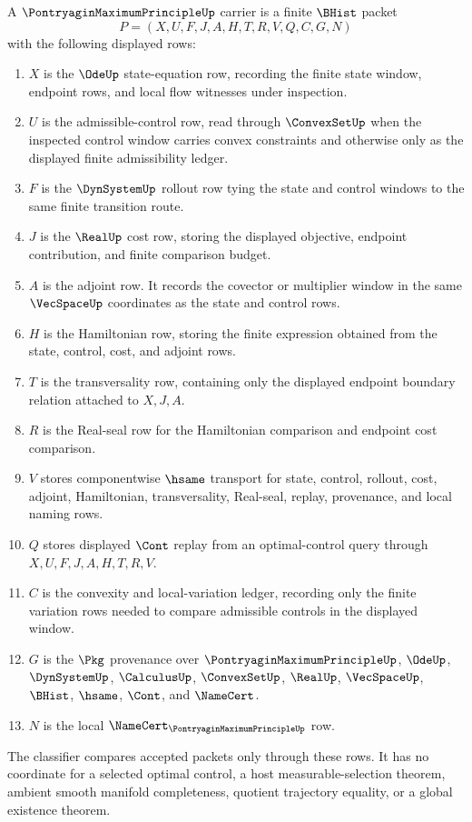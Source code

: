 \begin{definition}
\label{def:pontryagin-maximum-principle-carrier}
A $\PontryaginMaximumPrincipleUp$ carrier is a finite $\BHist$ packet
$$
P=(X,U,F,J,A,H,T,R,V,Q,C,G,N)
$$
with the following displayed rows:
\begin{enumerate}
\item $X$ is the $\OdeUp$ state-equation row, recording the finite state window, endpoint rows, and local flow witnesses under inspection.
\item $U$ is the admissible-control row, read through $\ConvexSetUp$ when the inspected control window carries convex constraints and otherwise only as the displayed finite admissibility ledger.
\item $F$ is the $\DynSystemUp$ rollout row tying the state and control windows to the same finite transition route.
\item $J$ is the $\RealUp$ cost row, storing the displayed objective, endpoint contribution, and finite comparison budget.
\item $A$ is the adjoint row. It records the covector or multiplier window in the same $\VecSpaceUp$ coordinates as the state and control rows.
\item $H$ is the Hamiltonian row, storing the finite expression obtained from the state, control, cost, and adjoint rows.
\item $T$ is the transversality row, containing only the displayed endpoint boundary relation attached to $X,J,A$.
\item $R$ is the Real-seal row for the Hamiltonian comparison and endpoint cost comparison.
\item $V$ stores componentwise $\hsame$ transport for state, control, rollout, cost, adjoint, Hamiltonian, transversality, Real-seal, replay, provenance, and local naming rows.
\item $Q$ stores displayed $\Cont$ replay from an optimal-control query through $X,U,F,J,A,H,T,R,V$.
\item $C$ is the convexity and local-variation ledger, recording only the finite variation rows needed to compare admissible controls in the displayed window.
\item $G$ is the $\Pkg$ provenance over $\PontryaginMaximumPrincipleUp$, $\OdeUp$, $\DynSystemUp$, $\CalculusUp$, $\ConvexSetUp$, $\RealUp$, $\VecSpaceUp$, $\BHist$, $\hsame$, $\Cont$, and $\NameCert$.
\item $N$ is the local $\NameCert_{\PontryaginMaximumPrincipleUp}$ row.
\end{enumerate}
The classifier compares accepted packets only through these rows. It has no coordinate for a selected optimal control, a host measurable-selection theorem, ambient smooth manifold completeness, quotient trajectory equality, or a global existence theorem.
\end{definition}

